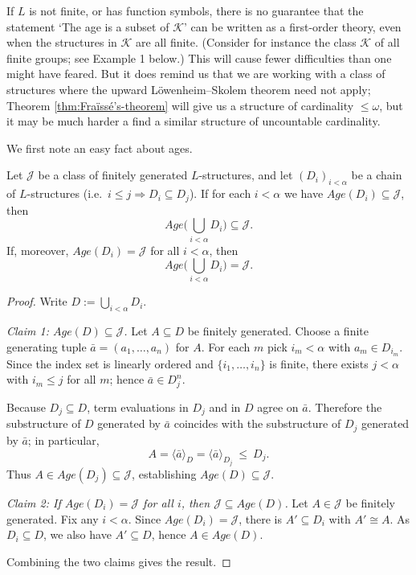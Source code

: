 If \(L\) is not finite, or has function symbols, there is no guarantee that the statement ‘The age is a subset of \(\mathcal{K}\)’ can be written as a first-order theory, even when the structures in \(\mathcal{K}\) are all finite. (Consider for instance the class \(\mathcal{K}\) of all finite groups; see Example 1 below.) This will cause fewer difficulties than one might have feared. But it does remind us that we are working with a class of structures where the upward Löwenheim--Skolem theorem need not apply; Theorem \ref{thm:Fraïssé’s-theorem} will give us a structure of cardinality \(\leq \omega\), but it may be much harder a find a similar structure of uncountable cardinality.

We first note an easy fact about ages.


\begin{lemma}
    Let $\mathcal J$ be a class of finitely generated $L$-structures, and let $(D_i)_{i<\alpha}$ be a chain of $L$-structures (i.e.\ $i\le j\Rightarrow D_i\subseteq D_j$). If for each $i<\alpha$ we have $Age(D_i)\subseteq\mathcal J$, then
    \[
        Age\Big(\bigcup_{i<\alpha} D_i\Big)\subseteq \mathcal J.
    \]
    If, moreover, $Age(D_i)=\mathcal J$ for all $i<\alpha$, then
    \[
        Age\Big(\bigcup_{i<\alpha} D_i\Big)= \mathcal J.
    \]
\end{lemma}

\begin{proof}
    Write $D:=\bigcup_{i<\alpha} D_i$.

    \emph{Claim 1: $Age(D)\subseteq \mathcal J$.}
    Let $A\subseteq D$ be finitely generated. Choose a finite generating tuple $\bar a=(a_1,\dots,a_n)$ for $A$.
    For each $m$ pick $i_m<\alpha$ with $a_m\in D_{i_m}$. Since the index set is linearly ordered and $\{i_1,\dots,i_n\}$ is finite, there exists $j<\alpha$ with $i_m\le j$ for all $m$; hence $\bar a\in D_j^n$.

    Because $D_j\subseteq D$, term evaluations in $D_j$ and in $D$ agree on $\bar a$. Therefore the substructure of $D$ generated by $\bar a$ coincides with the substructure of $D_j$ generated by $\bar a$; in particular,
    \[
        A=\langle \bar a\rangle_D=\langle \bar a\rangle_{D_j}\ \le\ D_j.
    \]
    Thus $A\in Age(D_j)\subseteq \mathcal J$, establishing $Age(D)\subseteq\mathcal J$.

    \emph{Claim 2: If $Age(D_i)=\mathcal J$ for all $i$, then $\mathcal J\subseteq Age(D)$.}
    Let $A\in\mathcal J$ be finitely generated. Fix any $i<\alpha$. Since $Age(D_i)=\mathcal J$, there is $A'\subseteq D_i$ with $A'\cong A$. As $D_i\subseteq D$, we also have $A'\subseteq D$, hence $A\in Age(D)$.

    Combining the two claims gives the result.
\end{proof}




